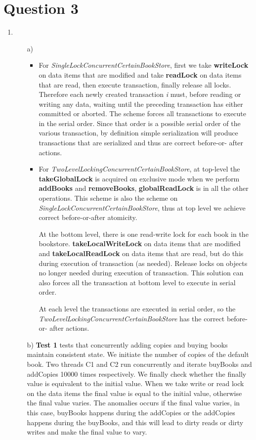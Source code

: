 \documentclass[11pt]{article}
\begin{document}
\section{Question 3}
\begin{enumerate}
	\item
		\begin{itemize}
		 \item[a)]
		 \begin{itemize}
		 \item
		 For \textit{SingleLockConcurrentCertainBookStore}, first we take \textbf{writeLock} on data 
		 items that are modified and take \textbf{readLock} on data items that are read, then execute 
		 transaction, finally release all locks. Therefore each newly created transaction \textit{i} 
		 must, before reading or writing any data, waiting until the preceding transaction has either 
		 committed or aborted. The scheme forces all transactions to execute in the serial order. 
		 Since that order is a possible serial order of the various transaction, by definition simple 
		 serialization will produce transactions that are serialized and thus are correct before-or-
		 after actions.
		 
		 \item
		 For \textit{TwoLevelLockingConcurrentCertainBookStore}, at top-level the
		 \textbf{takeGlobalLock} is acquired on exclusive mode when we perform \textbf{addBooks} and 
		 \textbf{removeBooks}, \textbf{globalReadLock} is in all the other operations. This scheme is 
		 also the scheme on \textit{SingleLockConcurrentCertainBookStore}, thus at top level we 
		 achieve correct before-or-after atomicity.
		 
		 At the bottom level, there is one read-write lock for each book in the bookstore.
		 \textbf{takeLocalWriteLock} on data items that are modified and \textbf{takeLocalReadLock} on 
		 data items that are read, but do this during execution of transaction (as needed). Release 
		 locks on objects no longer needed during execution of transaction. This solution can also 
		 forces all the transaction at bottom level to execute in serial order. 
		 
		 At each level the transactions are executed in serial order, so the  
		 \textit{TwoLevelLockingConcurrentCertainBookStore} has the correct before-or-
		 after actions.
		\end{itemize}
		
		\item[b)]
		\textbf{Test 1} tests that concurrently adding copies and buying books maintain consistent 
		state. We initiate the number of copies of the default book. Two threads C1 and C2 run 
		concurrently and iterate buyBooks and addCopies 10000 times  respectively. We finally check 
		whether the finally value is equivalent to the initial value. When we take write or read lock 
		on the data items the final value is equal to the initial value, otherwise the final value 
		varies. The anomalies occurs if the final value varies, in this case, buyBooks happens during 
		the addCopies or the addCopies happens during the buyBooks, and this will lead to dirty reads 
		or dirty writes and make the final value to vary.
		

\end{itemize}
\end{enumerate}
\end{document}
